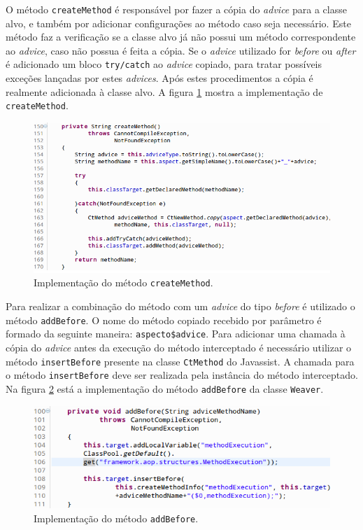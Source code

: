 \documentclass[tc,oneside]{iiufrgs}
\begin{document}
O método \texttt{createMethod} é responsável por fazer a cópia do \textit{advice} para a classe alvo, e também por adicionar configurações ao método caso seja necessário. Este método faz a verificação se a classe alvo já não possui um método correspondente ao \textit{advice}, caso não possua é feita a cópia. Se o \textit{advice} utilizado for \textit{before} ou \textit{after} é adicionado um bloco \texttt{try/catch} ao \textit{advice} copiado, para tratar possíveis exceções lançadas por estes \textit{advices}. Após estes procedimentos a cópia é realmente adicionada à classe alvo. A figura \ref{fig:createmethod} mostra a implementação de \texttt{createMethod}.

\begin{figure}[ht]
	\centering
	\includegraphics[scale=0.5]{figuras/implementacao/createmethod.png}
	\caption{Implementação do método \texttt{createMethod}.}
	\label{fig:createmethod}
\end{figure}

Para realizar a combinação do método com um \textit{advice} do tipo \textit{before} é utilizado o método \texttt{addBefore}. O nome do método copiado recebido por parâmetro é formado da seguinte maneira: \texttt{aspecto\$advice}. Para adicionar uma chamada à cópia do \textit{advice} antes da execução do método interceptado é necessário utilizar o método \texttt{insertBefore} presente na classe \texttt{CtMethod} do Javassist. A chamada para o método \texttt{insertBefore} deve ser realizada pela instância do método interceptado. Na figura \ref{fig:addbefore} está a implementação do método \texttt{addBefore} da classe \texttt{Weaver}.

\begin{figure}[ht]
	\centering
	\includegraphics[scale=0.5]{figuras/implementacao/addbefore.png}
	\caption{Implementação do método \texttt{addBefore}.}
	\label{fig:addbefore}
\end{figure}
\end{document}
